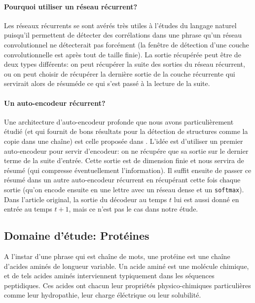 \documentclass[a4paper, 11pt, onecolumn]{article}
\begin{document}
\paragraph{Pourquoi utiliser un réseau récurrent?}

Les réseaux récurrents se sont avérés très utiles à l'études du langage naturel
puisqu'il permettent de détecter des corrélations dans une phrase qu'un réseau
convolutionnel ne détecterait pas forcément (la fenêtre de détection d'une
couche convolutionnelle est après tout de taille finie).  La sortie récupérée
peut être de deux types différents: on peut récupérer la suite des sorties du
réseau récurrent, ou on peut choisir de récupérer la dernière sortie de la
couche récurrente qui servirait alors de \og résumé\fg de ce qui s'est passé à
la lecture de la suite.

\paragraph{Un auto-encodeur récurrent?}

Une architecture d'auto-encodeur profonde que nous avons particulièrement étudié
(et qui fournit de bons résultats pour la détection de structures comme la copie
dans une chaîne) est celle proposée dans \cite{DBLP:journals/corr/ChoMGBSB14}.
L'idée est d'utiliser un premier auto-encodeur pour servir d'encodeur: on ne
récupére que sa sortie sur le dernier terme de la suite d'entrée. Cette sortie
est de dimension finie et nous servira de résumé (qui compresse éventuellement
l'information). Il suffit ensuite de passer ce résumé dans un autre
auto-encodeur récurrent en récupérant cette fois chaque sortie (qu'on encode
ensuite en une lettre avec un réseau dense et un \texttt{softmax}). Dans
l'article original, la sortie du décodeur au temps $t$ lui est aussi donné en
entrée au temps $t+1$, mais ce n'est pas le cas dans notre étude.

\subsection{Domaine d'étude: Protéines}

A l'instar d'une phrase qui est chaîne de mots, une protéine est une chaîne
d'acides aminés de longueur variable. Un acide aminé est une molécule chimique,
et de tels acides aminés interviennent typiquement dans les séquences
peptidiques. Ces acides ont chacun leur propriétés physico-chimiques
particulières comme leur hydropathie, leur charge éléctrique ou leur solubilité.
\end{document}
